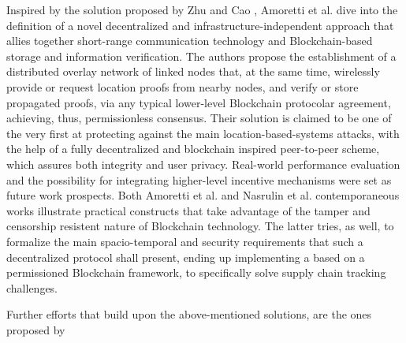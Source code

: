 Inspired by the solution proposed by Zhu and Cao \cite{zhu2011applaus}, Amoretti et al. \cite{amoretti2018blockchain} dive into the definition of a novel decentralized and infrastructure-independent approach that allies together short-range communication technology and Blockchain-based storage and information verification. The authors propose the establishment of a distributed overlay network of linked nodes that, at the same time, wirelessly provide or request location proofs from nearby nodes, and verify or store propagated proofs, via any typical lower-level Blockchain protocolar agreement, achieving, thus, permissionless consensus. Their solution is claimed to be one of the very first at protecting against the main location-based-systems attacks, with the help of a fully decentralized and blockchain inspired peer-to-peer scheme, which assures both integrity and user privacy. Real-world performance evaluation and the possibility for integrating higher-level incentive mechanisms were set as future work prospects. Both Amoretti et al. \cite{amoretti2018blockchain} and Nasrulin et al. \cite{nasrulin2018robust} contemporaneous works illustrate practical constructs that take advantage of the tamper and censorship resistent nature of Blockchain technology. The latter tries, as well, to formalize the main spacio-temporal and security requirements that such a decentralized \pol{} protocol shall present, ending up implementing a \poc{} based on a permissioned Blockchain framework, to specifically solve supply chain tracking challenges.

Further efforts that build upon the above-mentioned solutions, are the ones proposed by 